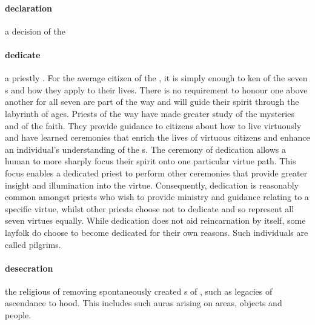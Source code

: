 \paragraph{declaration} a decision of the  %
\paragraph{dedicate} a priestly . For the average citizen of the , it is simply enough to ken of the seven s and how they apply to their lives. There is no requirement to honour one above another for all seven are part of the way and will guide their spirit through the labyrinth of ages. Priests of the way have made greater study of the mysteries and  of the faith. They provide guidance to citizens about how to live virtuously and have learned ceremonies that enrich the lives of virtuous citizens and enhance an individual’s understanding of the s. The  ceremony of dedication allows a human to more sharply focus their spirit onto one particular virtue path. This focus enables a dedicated priest to perform other ceremonies that provide greater insight and illumination into the virtue. \localpar Consequently, dedication is reasonably common amongst priests who wish to provide ministry and guidance relating to a specific virtue, whilst other priests choose not to dedicate and so represent all seven virtues equally. While dedication does not aid reincarnation by itself, some layfolk do choose to become dedicated for their own reasons. Such individuals are called pilgrims. 
\paragraph{desecration} the religious  of removing spontaneously created s of , such as legacies of ascendance to hood. This includes such auras arising on areas, objects and people.
